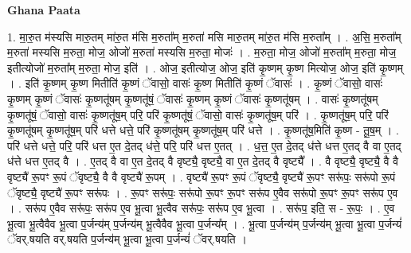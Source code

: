 \documentclass[17pt]{extarticle}
\begin{document}
\textbf{Ghana Paata } \newline

1. मा॒रु॒त म॑स्यसि मारु॒तम् मा॑रु॒त म॑सि म॒रुता᳚म् म॒रुता॑ मसि मारु॒तम् मा॑रु॒त म॑सि म॒रुता᳚म् । . अ॒सि॒ म॒रुता᳚म् म॒रुता॑ मस्यसि म॒रुता॒ मोज॒ ओजो॑ म॒रुता॑ मस्यसि म॒रुता॒ मोजः॑ । . म॒रुता॒ मोज॒ ओजो॑ म॒रुता᳚म् म॒रुता॒ मोज॒ इतीत्योजो॑ म॒रुता᳚म् म॒रुता॒ मोज॒ इति॑ । . ओज॒ इतीत्योज॒ ओज॒ इति॑ कृ॒ष्णम् कृ॒ष्ण मित्योज॒ ओज॒ इति॑ कृ॒ष्णम् । . इति॑ कृ॒ष्णम् कृ॒ष्ण मितीति॑ कृ॒ष्णं ॅवासो॒ वासः॑ कृ॒ष्ण मितीति॑ कृ॒ष्णं ॅवासः॑ । . कृ॒ष्णं ॅवासो॒ वासः॑ कृ॒ष्णम् कृ॒ष्णं ॅवासः॑ कृ॒ष्णतू॑षम् कृ॒ष्णतू॑षं॒ ॅवासः॑ कृ॒ष्णम् कृ॒ष्णं ॅवासः॑ कृ॒ष्णतू॑षम् । . वासः॑ कृ॒ष्णतू॑षम् कृ॒ष्णतू॑षं॒ ॅवासो॒ वासः॑ कृ॒ष्णतू॑ष॒म् परि॒ परि॑ कृ॒ष्णतू॑षं॒ ॅवासो॒ वासः॑ कृ॒ष्णतू॑ष॒म् परि॑ । . कृ॒ष्णतू॑ष॒म् परि॒ परि॑ कृ॒ष्णतू॑षम् कृ॒ष्णतू॑ष॒म् परि॑ धत्ते धत्ते॒ परि॑ कृ॒ष्णतू॑षम् कृ॒ष्णतू॑ष॒म् परि॑ धत्ते । . कृ॒ष्णतू॑ष॒मिति॑ कृ॒ष्ण - तू॒ष॒म् । . परि॑ धत्ते धत्ते॒ परि॒ परि॑ धत्त ए॒त दे॒तद् ध॑त्ते॒ परि॒ परि॑ धत्त ए॒तत् । . ध॒त्त॒ ए॒त दे॒तद् ध॑त्ते धत्त ए॒तद् वै वा ए॒तद् ध॑त्ते धत्त ए॒तद् वै । . ए॒तद् वै वा ए॒त दे॒तद् वै वृष्ट्यै॒ वृष्ट्यै॒ वा ए॒त दे॒तद् वै वृष्ट्यै᳚ । . वै वृष्ट्यै॒ वृष्ट्यै॒ वै वै वृष्ट्यै॑ रू॒पꣳ रू॒पं ॅवृष्ट्यै॒ वै वै वृष्ट्यै॑ रू॒पम् । . वृष्ट्यै॑ रू॒पꣳ रू॒पं ॅवृष्ट्यै॒ वृष्ट्यै॑ रू॒पꣳ सरू॑पः॒ सरू॑पो रू॒पं ॅवृष्ट्यै॒ वृष्ट्यै॑ रू॒पꣳ सरू॑पः । . रू॒पꣳ सरू॑पः॒ सरू॑पो रू॒पꣳ रू॒पꣳ सरू॑प ए॒वैव सरू॑पो रू॒पꣳ रू॒पꣳ सरू॑प ए॒व । . सरू॑प ए॒वैव सरू॑पः॒ सरू॑प ए॒व भू॒त्वा भू॒त्वैव सरू॑पः॒ सरू॑प ए॒व भू॒त्वा । . सरू॑प॒ इति॒ स - रू॒पः॒ । . ए॒व भू॒त्वा भू॒त्वैवैव भू॒त्वा प॒र्जन्य॑म् प॒र्जन्य॑म् भू॒त्वैवैव भू॒त्वा प॒र्जन्य᳚म् । . भू॒त्वा प॒र्जन्य॑म् प॒र्जन्य॑म् भू॒त्वा भू॒त्वा प॒र्जन्यं॑ ॅवर्.षयति वर्.षयति प॒र्जन्य॑म् भू॒त्वा भू॒त्वा प॒र्जन्यं॑ ॅवर्.षयति । \newline
\end{document}
